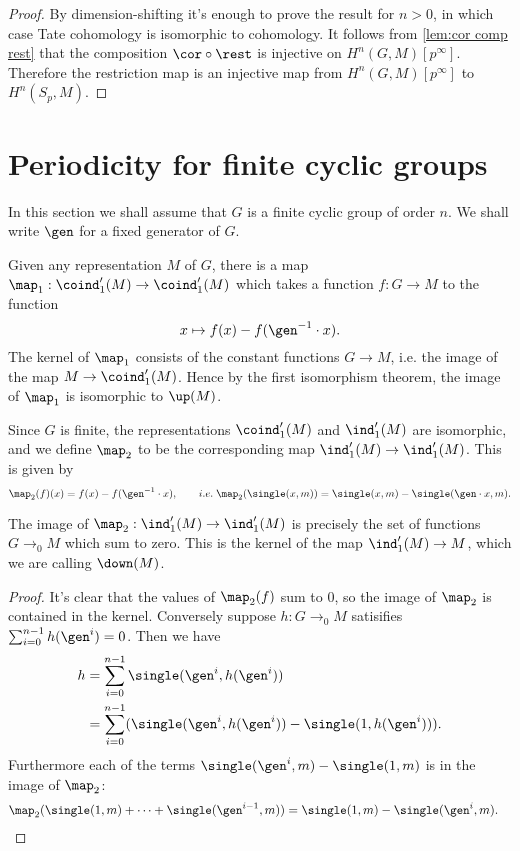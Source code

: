 \begin{proof}
	By dimension-shifting it's enough to prove the result for $n > 0$, in which case
	Tate cohomology is isomorphic to cohomology.
	It follows from \ref{lem:cor comp rest} that the
	composition $\cor \circ \rest$ is injective on $H^n(G,M)[p^\infty]$.
	Therefore the restriction map is an injective map from $H^n(G,M)[p^\infty]$
	to $H^n(S_p,M)$.
\end{proof}






\section{Periodicity for finite cyclic groups}

In this section we shall assume that $G$ is a finite cyclic group of order $n$.
We shall write $\gen$ for a fixed generator of $G$.

Given any representation $M$ of $G$, there is a map
$\map_1 : \coind_1'(M) \to \coind_1'(M)$ which takes a function $f : G \to M$ to the function
\[
	x \mapsto f(x) - f(\gen^{-1}\cdot x).
\]
The kernel of $\map_1$ consists of the constant functions $G \to M$, i.e. the image of the
map $M \to \coind_1'(M)$.
Hence by the first isomorphism theorem, the image of $\map_1$ is isomorphic to $\up(M)$.

Since $G$ is finite, the representations $\coind_1'(M)$ and $\ind_1'(M)$
are isomorphic, and we define $\map_2$ to be the corresponding map $\ind_1'(M) \to \ind_1'(M)$.
This is given by
\[
	\map_2(f) (x) = f(x) - f(\gen^{-1} \cdot x), \qquad i.e.\;
	\map_2(\single(x,m)) = \single(x,m) - \single(\gen \cdot x, m).
\]
\begin{lemma} \label{lem:map2 image}
	\leanok
	The image of $\map_2 : \ind_1'(M) \to \ind_1'(M)$ is precisely the set of functions $G \to_0 M$
	which sum to zero. This is the kernel of the map $\ind_1'(M) \to M$,
	which we are calling $\down(M)$.
\end{lemma}

\begin{proof}
	\leanok
	It's clear that the values of $\map_2(f)$ sum to $0$, so the image of $\map_2$ is contained in
	the kernel.
	Conversely suppose $h : G \to_0 M$ satisifies $\sum_{i=0}^{n-1} h(\gen^i) = 0$.
	Then we have
	\begin{align*}
		h
		& = \sum_{i=0}^{n-1} \single(\gen^i, h(\gen^i))\\
		& = \sum_{i=0}^{n-1} (\single(\gen^i, h(\gen^i)) - \single(1, h(\gen^i))).
	\end{align*}
	Furthermore each of the terms $\single(\gen^i, m) - \single(1, m)$ is in the
	image of $\map_2$:
	\begin{align*}
		\map_2 (\single(1,m) + \cdots + \single(\gen^{i-1},m))
		&=\single(1,m) - \single(\gen^i,m).
	\end{align*}
\end{proof}

